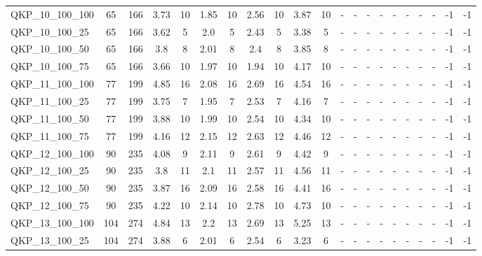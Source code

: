 \begin{sidewaystable}[!ht]
{\begin{tabular}{lcccccccccccccccccccc}
QKP\_10\_100\_100 & 65 & 166 & 3.73 & 10 &  \textcolor{blue2}{1.85} & 10 & 2.56 & 10 & 3.87 & 10 &  - &  - &  - &  - &  - &  - &  - &  - & -1 & -1 \\
QKP\_10\_100\_25 & 65 & 166 & 3.62 & 5 &  \textcolor{blue2}{2.0} & 5 & 2.43 & 5 & 3.38 & 5 &  - &  - &  - &  - &  - &  - &  - &  - & -1 & -1 \\
QKP\_10\_100\_50 & 65 & 166 & 3.8 & 8 &  \textcolor{blue2}{2.01} & 8 & 2.4 & 8 & 3.85 & 8 &  - &  - &  - &  - &  - &  - &  - &  - & -1 & -1 \\
QKP\_10\_100\_75 & 65 & 166 & 3.66 & 10 & 1.97 & 10 &  \textcolor{blue2}{1.94} & 10 & 4.17 & 10 &  - &  - &  - &  - &  - &  - &  - &  - & -1 & -1 \\
QKP\_11\_100\_100 & 77 & 199 & 4.85 & 16 &  \textcolor{blue2}{2.08} & 16 & 2.69 & 16 & 4.54 & 16 &  - &  - &  - &  - &  - &  - &  - &  - & -1 & -1 \\
QKP\_11\_100\_25 & 77 & 199 & 3.75 & 7 &  \textcolor{blue2}{1.95} & 7 & 2.53 & 7 & 4.16 & 7 &  - &  - &  - &  - &  - &  - &  - &  - & -1 & -1 \\
QKP\_11\_100\_50 & 77 & 199 & 3.88 & 10 &  \textcolor{blue2}{1.99} & 10 & 2.54 & 10 & 4.34 & 10 &  - &  - &  - &  - &  - &  - &  - &  - & -1 & -1 \\
QKP\_11\_100\_75 & 77 & 199 & 4.16 & 12 &  \textcolor{blue2}{2.15} & 12 & 2.63 & 12 & 4.46 & 12 &  - &  - &  - &  - &  - &  - &  - &  - & -1 & -1 \\
QKP\_12\_100\_100 & 90 & 235 & 4.08 & 9 &  \textcolor{blue2}{2.11} & 9 & 2.61 & 9 & 4.42 & 9 &  - &  - &  - &  - &  - &  - &  - &  - & -1 & -1 \\
QKP\_12\_100\_25 & 90 & 235 & 3.8 & 11 &  \textcolor{blue2}{2.1} & 11 & 2.57 & 11 & 4.56 & 11 &  - &  - &  - &  - &  - &  - &  - &  - & -1 & -1 \\
QKP\_12\_100\_50 & 90 & 235 & 3.87 & 16 &  \textcolor{blue2}{2.09} & 16 & 2.58 & 16 & 4.41 & 16 &  - &  - &  - &  - &  - &  - &  - &  - & -1 & -1 \\
QKP\_12\_100\_75 & 90 & 235 & 4.22 & 10 &  \textcolor{blue2}{2.14} & 10 & 2.78 & 10 & 4.73 & 10 &  - &  - &  - &  - &  - &  - &  - &  - & -1 & -1 \\
QKP\_13\_100\_100 & 104 & 274 & 4.84 & 13 &  \textcolor{blue2}{2.2} & 13 & 2.69 & 13 & 5.25 & 13 &  - &  - &  - &  - &  - &  - &  - &  - & -1 & -1 \\
QKP\_13\_100\_25 & 104 & 274 & 3.88 & 6 &  \textcolor{blue2}{2.01} & 6 & 2.54 & 6 & 3.23 & 6 &  - &  - &  - &  - &  - &  - &  - &  - & -1 & -1 \\

\end{tabular}}
\end{sidewaystable}
